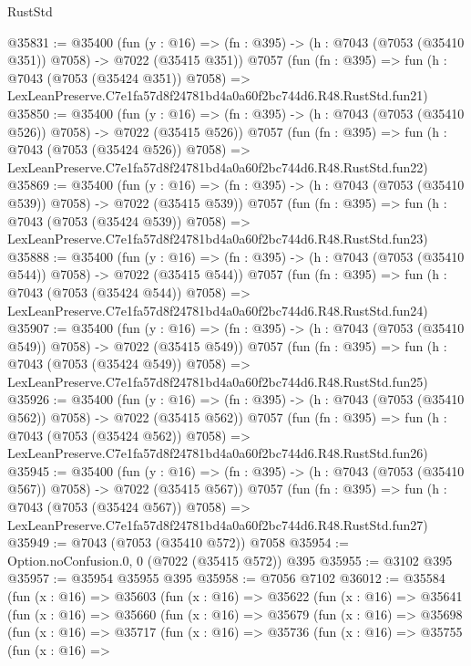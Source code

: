 \begin{lexlean}{RustStd}
\begin{coremodule}
@35831 := @35400
    (fun (y : @16) => (fn : @395) -> (h : @7043 (@7053 (@35410 @351)) @7058) -> @7022 (@35415 @351))
    @7057
    (fun (fn : @395) =>
    fun (h : @7043 (@7053 (@35424 @351)) @7058) =>
    LexLeanPreserve.C7e1fa57d8f24781bd4a0a60f2bc744d6.R48.RustStd.fun21)
@35850 := @35400
    (fun (y : @16) => (fn : @395) -> (h : @7043 (@7053 (@35410 @526)) @7058) -> @7022 (@35415 @526))
    @7057
    (fun (fn : @395) =>
    fun (h : @7043 (@7053 (@35424 @526)) @7058) =>
    LexLeanPreserve.C7e1fa57d8f24781bd4a0a60f2bc744d6.R48.RustStd.fun22)
@35869 := @35400
    (fun (y : @16) => (fn : @395) -> (h : @7043 (@7053 (@35410 @539)) @7058) -> @7022 (@35415 @539))
    @7057
    (fun (fn : @395) =>
    fun (h : @7043 (@7053 (@35424 @539)) @7058) =>
    LexLeanPreserve.C7e1fa57d8f24781bd4a0a60f2bc744d6.R48.RustStd.fun23)
@35888 := @35400
    (fun (y : @16) => (fn : @395) -> (h : @7043 (@7053 (@35410 @544)) @7058) -> @7022 (@35415 @544))
    @7057
    (fun (fn : @395) =>
    fun (h : @7043 (@7053 (@35424 @544)) @7058) =>
    LexLeanPreserve.C7e1fa57d8f24781bd4a0a60f2bc744d6.R48.RustStd.fun24)
@35907 := @35400
    (fun (y : @16) => (fn : @395) -> (h : @7043 (@7053 (@35410 @549)) @7058) -> @7022 (@35415 @549))
    @7057
    (fun (fn : @395) =>
    fun (h : @7043 (@7053 (@35424 @549)) @7058) =>
    LexLeanPreserve.C7e1fa57d8f24781bd4a0a60f2bc744d6.R48.RustStd.fun25)
@35926 := @35400
    (fun (y : @16) => (fn : @395) -> (h : @7043 (@7053 (@35410 @562)) @7058) -> @7022 (@35415 @562))
    @7057
    (fun (fn : @395) =>
    fun (h : @7043 (@7053 (@35424 @562)) @7058) =>
    LexLeanPreserve.C7e1fa57d8f24781bd4a0a60f2bc744d6.R48.RustStd.fun26)
@35945 := @35400
    (fun (y : @16) => (fn : @395) -> (h : @7043 (@7053 (@35410 @567)) @7058) -> @7022 (@35415 @567))
    @7057
    (fun (fn : @395) =>
    fun (h : @7043 (@7053 (@35424 @567)) @7058) =>
    LexLeanPreserve.C7e1fa57d8f24781bd4a0a60f2bc744d6.R48.RustStd.fun27)
@35949 := @7043 (@7053 (@35410 @572)) @7058
@35954 := Option.noConfusion.{0, 0} (@7022 (@35415 @572)) @395
@35955 := @3102 @395
@35957 := @35954 @35955 @395
@35958 := @7056 @7102
@36012 := @35584
    (fun (x : @16) =>
    @35603
      (fun (x : @16) =>
      @35622
        (fun (x : @16) =>
        @35641
          (fun (x : @16) =>
          @35660
            (fun (x : @16) =>
            @35679
              (fun (x : @16) =>
              @35698
                (fun (x : @16) =>
                @35717
                  (fun (x : @16) =>
                  @35736
                    (fun (x : @16) =>
                    @35755
                      (fun (x : @16) =>

\end{coremodule}
\end{lexlean}
